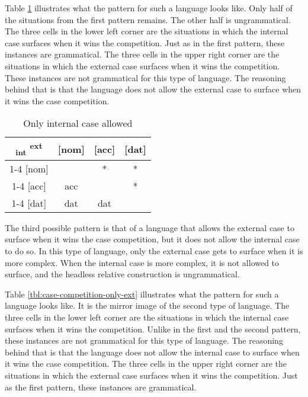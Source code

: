 Table \ref{tbl:case-competition-only-int} illustrates what the pattern for such a language looks like. Only half of the situations from the first pattern remains. The other half is ungrammatical.
The three cells in the lower left corner are the situations in which the internal case surfaces when it wins the competition. Just as in the first pattern, these instances are grammatical.
The three cells in the upper right corner are the situations in which the external case surfaces when it wins the competition. These instances are not grammatical for this type of language. The reasoning behind that is that the language does not allow the external case to surface when it wins the case competition.

\begin{table}[H]
  \center
  \caption{Only internal case allowed}
  \begin{tabular}{c|c|c|c}
    \toprule
    \textsubscript{\ac{int}} \textsuperscript{\ac{ext}}
           & [\ac{nom}]
           & [\ac{acc}]
           & [\ac{dat}]
           \\ \cmidrule{1-4}
       [\ac{nom}]
           & \xcancel{\phantom{xx}}
           & *
           & *
           \\ \cmidrule{1-4}
       [\ac{acc}]
           & \ac{acc}
           & \xcancel{\phantom{xx}}
           & *
           \\ \cmidrule{1-4}
       [\ac{dat}]
           & \ac{dat}
           & \ac{dat}
           & \xcancel{\phantom{xx}}
           \\
     \bottomrule
  \end{tabular}
    \label{tbl:case-competition-only-int}
\end{table}

The third possible pattern is that of a language that allows the external case to surface when it wins the case competition, but it does not allow the internal case to do so. In this type of language, only the external case gets to surface when it is more complex. When the internal case is more complex, it is not allowed to surface, and the headless relative construction is ungrammatical.

Table \ref{tbl:case-competition-only-ext} illustrates what the pattern for such a language looks like. It is the mirror image of the second type of language.
The three cells in the lower left corner are the situations in which the internal case surfaces when it wins the competition. Unlike in the first and the second pattern, these instances are not grammatical for this type of language. The reasoning behind that is that the language does not allow the internal case to surface when it wins the case competition.
The three cells in the upper right corner are the situations in which the external case surfaces when it wins the competition. Just as the first pattern, these instances are grammatical.

